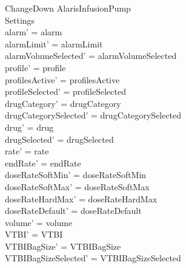 \begin{schema}{ChangeDown}
	\Delta AlarisInfusionPump\\
	 
	Settings\\
	\where
	alarm' = alarm\\
	alarmLimit' = alarmLimit\\
	alarmVolumeSelected' = alarmVolumeSelected\\
	profile' = profile\\
	profilesActive' = profilesActive\\  
	  profileSelected' = profileSelected\\
	drugCategory' = drugCategory\\ drugCategorySelected' = drugCategorySelected\\
	drug' = drug\\ drugSelected' = drugSelected\\
	rate' = rate\\
	endRate' = endRate\\
	doseRateSoftMin' = doseRateSoftMin\\
	\pagebreak
	doseRateSoftMax' = doseRateSoftMax\\
	doseRateHardMax' = doseRateHardMax\\
	doseRateDefault' = doseRateDefault\\
	volume' = volume\\
	VTBI' = VTBI\\
	VTBIBagSize' = VTBIBagSize\\ VTBIBagSizeSelected' = VTBIBagSizeSelected\\

\end{schema}
